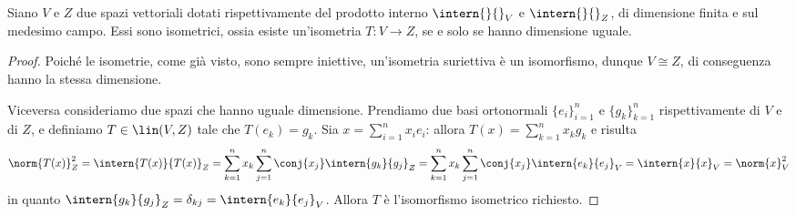 \begin{corollario} \label{t:spazi-isometrici}
	Siano $V$ e $Z$ due spazi vettoriali dotati rispettivamente del prodotto interno $\intern{}{}_V$ e $\intern{}{}_Z$, di dimensione finita e sul medesimo campo.
	Essi sono isometrici, ossia esiste un'isometria $T\colon V\to Z$, se e solo se hanno dimensione uguale.
\end{corollario}
\begin{proof}
	Poich\'e le isometrie, come già visto, sono sempre iniettive, un'isometria suriettiva è un isomorfismo, dunque $V\cong Z$, di conseguenza hanno la stessa dimensione.
	
	Viceversa consideriamo due spazi che hanno uguale dimensione.
	Prendiamo due basi ortonormali $\{e_i\}_{i=1}^n$ e $\{g_k\}_{k=1}^n$ rispettivamente di $V$ e di $Z$, e definiamo $T\in\lin(V,Z)$ tale che $T(e_k)=g_k$.
	Sia $x=\sum_{i=1}^nx_ie_i$: allora $T(x)=\sum_{k=1}^nx_kg_k$ e risulta
	\begin{equation*}
		\norm{T(x)}_Z^2=\intern{T(x)}{T(x)}_Z=\sum_{k=1}^nx_k\sum_{j=1}^n\conj{x_j}\intern{g_k}{g_j}_Z=\sum_{k=1}^nx_k\sum_{j=1}^n\conj{x_j}\intern{e_k}{e_j}_V=\intern{x}{x}_V=\norm{x}_V^2
	\end{equation*}
	in quanto $\intern{g_k}{g_j}_Z=\delta_{kj}=\intern{e_k}{e_j}_V$.
	Allora $T$ è l'isomorfismo isometrico richiesto.
\end{proof}

